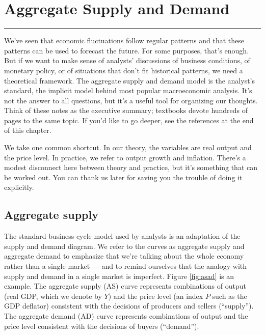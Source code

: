 \chapter{Aggregate Supply and Demand}\label{chp:asad}
\hypertarget{asad}{}


\rule{\textwidth}{1pt}

We've seen that economic fluctuations follow regular patterns
and that these patterns can be used to forecast the future.
For some purposes, that's enough.
But if we want to make sense of analysts' discussions of business conditions,
of monetary policy,
or of situations that don't fit historical patterns,
we need a theoretical framework.
The aggregate supply and demand model is the analyst's standard,
the implicit model behind most popular macroeconomic analysis.
It's not the answer to all questions,
but it's a useful tool for organizing our thoughts.
Think of these notes as the executive summary;
textbooks devote hundreds of pages to the same topic.
If you'd like to go deeper, see the references at the end of this chapter.

We take one common shortcut.
In our theory, the variables are real output and the price level.
In practice, we refer to output growth and inflation.
There's a modest disconnect here between theory and practice,
but it's something that can be worked out.
You can thank us later for saving you the trouble of
doing it explicitly.


\section{Aggregate supply}

The standard business-cycle model used by analysts
is an adaptation of the supply and demand diagram.
We refer to the curves as aggregate supply and aggregate demand to emphasize that we're talking about the whole economy
rather than a single market --- and to remind ourselves that the analogy with supply and demand
in a single market is imperfect.
Figure \ref{fig:asad} is an example.
The aggregate supply (AS) curve  represents combinations of
output (real GDP, which we denote by $Y$) and the price level
(an index $P$ such as the GDP deflator)
consistent with the decisions of producers and sellers (``supply'').
The aggregate demand (AD)
 curve represents combinations of output and the price
level consistent with the decisions of buyers (``demand'').

